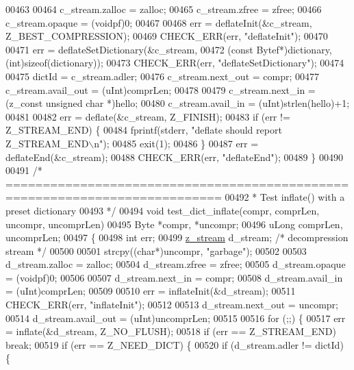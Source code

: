 \begin{DoxyCode}
{{{{{{{{{{{{{{00463 
00464     c\_stream.zalloc = zalloc;
00465     c\_stream.zfree = zfree;
00466     c\_stream.opaque = (voidpf)0;
00467 
00468     err = deflateInit(&c\_stream, Z\_BEST\_COMPRESSION);
00469     CHECK\_ERR(err, \textcolor{stringliteral}{"deflateInit"});
00470 
00471     err = deflateSetDictionary(&c\_stream,
00472                 (\textcolor{keyword}{const} Bytef*)dictionary, (\textcolor{keywordtype}{int})\textcolor{keyword}{sizeof}(dictionary));
00473     CHECK\_ERR(err, \textcolor{stringliteral}{"deflateSetDictionary"});
00474 
00475     dictId = c\_stream.adler;
00476     c\_stream.next\_out = compr;
00477     c\_stream.avail\_out = (uInt)comprLen;
00478 
00479     c\_stream.next\_in = (z\_const \textcolor{keywordtype}{unsigned} \textcolor{keywordtype}{char} *)hello;
00480     c\_stream.avail\_in = (uInt)strlen(hello)+1;
00481 
00482     err = deflate(&c\_stream, Z\_FINISH);
00483     \textcolor{keywordflow}{if} (err != Z\_STREAM\_END) \{
00484         fprintf(stderr, \textcolor{stringliteral}{"deflate should report Z\_STREAM\_END\(\backslash\)n"});
00485         exit(1);
00486     \}
00487     err = deflateEnd(&c\_stream);
00488     CHECK\_ERR(err, \textcolor{stringliteral}{"deflateEnd"});
00489 \}
00490 
00491 \textcolor{comment}{/* ===========================================================================}
00492 \textcolor{comment}{ * Test inflate() with a preset dictionary}
00493 \textcolor{comment}{ */}
00494 \textcolor{keywordtype}{void} test\_dict\_inflate(compr, comprLen, uncompr, uncomprLen)
00495     Byte *compr, *uncompr;
00496     uLong comprLen, uncomprLen;
00497 \{
00498     \textcolor{keywordtype}{int} err;
00499     \hyperlink{structz__stream__s}{z\_stream} d\_stream; \textcolor{comment}{/* decompression stream */}
00500 
00501     strcpy((\textcolor{keywordtype}{char}*)uncompr, \textcolor{stringliteral}{"garbage"});
00502 
00503     d\_stream.zalloc = zalloc;
00504     d\_stream.zfree = zfree;
00505     d\_stream.opaque = (voidpf)0;
00506 
00507     d\_stream.next\_in  = compr;
00508     d\_stream.avail\_in = (uInt)comprLen;
00509 
00510     err = inflateInit(&d\_stream);
00511     CHECK\_ERR(err, \textcolor{stringliteral}{"inflateInit"});
00512 
00513     d\_stream.next\_out = uncompr;
00514     d\_stream.avail\_out = (uInt)uncomprLen;
00515 
00516     \textcolor{keywordflow}{for} (;;) \{
00517         err = inflate(&d\_stream, Z\_NO\_FLUSH);
00518         \textcolor{keywordflow}{if} (err == Z\_STREAM\_END) \textcolor{keywordflow}{break};
00519         \textcolor{keywordflow}{if} (err == Z\_NEED\_DICT) \{
00520             \textcolor{keywordflow}{if} (d\_stream.adler != dictId) \{
}}}}}}}}}}}}}}
\end{DoxyCode}
